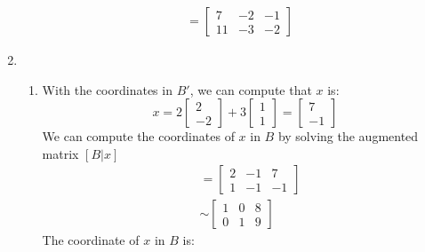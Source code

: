 \documentclass[12pt]{article}
\begin{document}
\begin{enumerate}[label=\alph*.]
\begin{align*}
                        &= \left[\begin{matrix}
                             7 & -2 & -1\\
                            11 & -3 & -2
                        \end{matrix}\right]
                    \end{align*}
                \item \begin{enumerate}[label=(\roman*)]
                    \item With the coordinates in $B'$, we can compute that $x$ is:
                        \begin{equation*}
                            x = 2\left[\begin{matrix}
                                2\\
                                -2
                            \end{matrix}\right] + 3 \left[\begin{matrix}
                                1\\
                                1
                            \end{matrix}\right] = \left[\begin{matrix}
                                7\\
                                -1
                            \end{matrix}\right]
                        \end{equation*}
                        We can compute the coordinates of $x$ in $B$ by solving the augmented matrix $[B | x]$
                        \begin{align*}
                            [B | x] &= \left[\begin{array}{cc|c}
                                2 & -1 & 7\\
                                1 & -1 & -1
                            \end{array}\right]\\
                            &\sim \left[\begin{array}{cc|c}
                                1 & 0 & 8\\
                                0 & 1 & 9
                           \end{array}\right] 
                        \end{align*}
                        The coordinate of $x$ in $B$ is:

\end{enumerate}
\end{enumerate}
\end{document}
